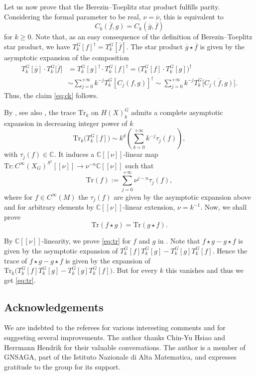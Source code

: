 \documentclass[pdftex]{sigma}
\numberwithin{equation}{section}
\begin{document}
 	Let us now prove that the Berezin--Toeplitz star product fulfills parity. Considering the formal parameter to be real, $\nu =\overline{\nu}$, this is equivalent to
 	\begin{equation} \label{eq:ck}
 		\overline{C_k(f, g)}=C_k(\overline{g}, \overline{f})
 	\end{equation}
 	for $k\geq 0$. Note that, as an easy consequence of the definition of Berezin--Toeplitz star product, we have
 	$T_k^G[f]^{\dagger}=T_k^G[\overline{f}]$.
 	The star product $\overline{g}\star\overline{f}$ is given by the asymptotic expansion of the composition
 	\begin{align*}
 		T_k^G[\overline{g}]\cdot T_k^G\big[\overline{f}\big]&=T_k^G[g]^{\dag}\cdot T_k^G[f]^{\dag} =\bigl(T_k^G[{f}]\cdot T_k^G[g]\bigr)^{\dag} \\
 		&\sim \sum_{j=0}^{+\infty} k^{-j} T_k^G[C_j(f, g)]^{\dag}
 		\sim \sum_{j=0}^{+\infty} k^{-j} T_k^G\big[\overline{C_j(f, g)}\big] .
 	\end{align*}
 	Thus, the claim \eqref{eq:ck} follows.
 	
 	By \cite{gh}, see also \cite{gh2}, the trace $\mathrm{Tr}_k$ on $H(X)^G_k$ admits a complete asymptotic expansion in decreasing integer power of $k$
 	\[\mathrm{Tr}_k\bigl(T^G_k[f] \bigr)\sim k^d\left(\sum_{k=0}^{+\infty} k^{-j} \tau_j(f)\right) ,\]
 	with $\tau_j(f)\in \mathbb{C}$. It induces a $\mathbb{C}[[\nu]]$-linear map
$\mathrm{Tr} \colon {C}^{\infty}(X_G)^{S^1}[[\nu]]\rightarrow \nu^{-n} \mathbb{C}[[\nu]]$
 	such that
 	\[\mathrm{Tr}(f):= \sum_{j=0}^{+\infty}\nu^{j-n} \tau_j(f) , \]
 	where for $f \in C^{\infty}(M)$ the $\tau_j(f)$ are given by the asymptotic expansion above and for arbitrary elements by $\mathbb{C}[[\nu]]$-linear extension, $\nu = k^{-1}$.
 	Now, we shall prove
 	\begin{equation} \label{eq:tr}
 		\mathrm{Tr}(f\star g)=\mathrm{Tr}(g\star f) .
 	\end{equation}
 	
 	By $\mathbb{C}[[\nu]]$-linearity, we prove \eqref{eq:tr} for $f$ and $g$ in . Note that $f\star g - g \star f$ is given by the asymptotic expansion of
 	$ T^G_k[f] T^G_k[g]- T^G_k[g] T^G_k[f]$.
 	Hence the trace of $f\star g - g \star f$ is given by the expansion of
 	$\mathrm{Tr}_k\bigl( T^G_k[f] T^G_k[g]- T^G_k[g] T^G_k[f] \bigr) $.
 	But for every $k$ this vanishes and thus we get \eqref{eq:tr}.


\subsection*{Acknowledgements}
We are indebted to the referees for various interesting comments and for suggesting several improvements. The author thanks Chin-Yu Hsiao and Herrmann Hendrik for their valuable conversations. The author is a member of GNSAGA, part of the Istituto Nazionale di Alta Matematica, and expresses gratitude to the group for its support.
 	
\end{document}
